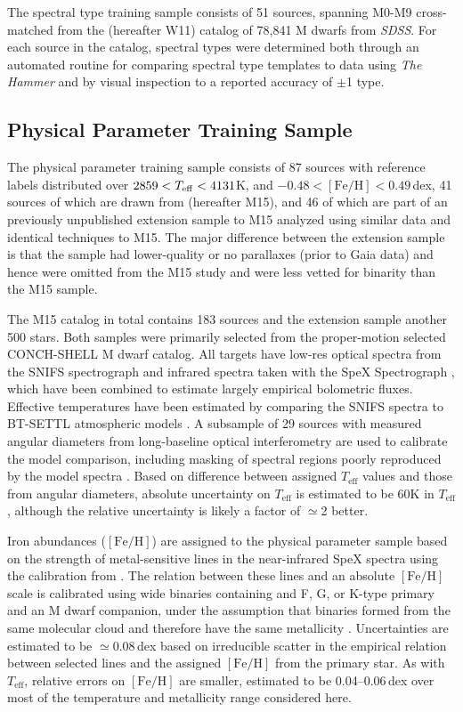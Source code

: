 \documentclass[twocolumn]{aastex62}
\newcommand{\sdss}{\textsl{SDSS}}
\newcommand{\teff}{T_{\mathrm{eff}}}
\newcommand{\feh}{[{\mathrm{Fe}/\mathrm{H}}]}
\begin{document}
The spectral type training sample consists of 51 sources, spanning M0-M9 cross-matched from the \citealt{West:2011} (hereafter W11) catalog of 78,841 M dwarfs from \sdss. For each source in the catalog, spectral types were determined both through an automated routine for comparing spectral type templates to data using \textsl{The Hammer} \citep{Covey:2007} and by visual inspection to a reported accuracy of $\pm$1 type.

\subsection{Physical Parameter Training Sample}

The physical parameter training sample consists of 87 sources with reference labels distributed over $2859 <T_{\rm eff} < 4131$K, and $-0.48 < \feh < 0.49$\,dex, 41 sources of which are drawn from \citealt{Mann:2015} (hereafter M15), and 46 of which are part of an previously unpublished extension sample to M15 analyzed using similar data and identical techniques to M15. The major difference between the extension sample is that the sample had lower-quality or no parallaxes (prior to Gaia data) and hence were omitted from the M15 study and were less vetted for binarity than the M15 sample.

The M15 catalog in total contains 183 sources and the extension sample another 500 stars. Both samples were primarily selected from the proper-motion selected CONCH-SHELL \citep{Gaidos:2013} M dwarf catalog. All targets have low-res optical spectra from the SNIFS spectrograph \citep{Lantz:2004} and infrared spectra taken with the SpeX Spectrograph \citep{Rayner:2003}, which have been combined to estimate largely empirical bolometric fluxes. Effective temperatures have been estimated by comparing the SNIFS spectra to BT-SETTL atmospheric models \citep{Allard:2011}. A subsample of 29 sources with measured angular diameters from long-baseline optical interferometry \citep{Boyajian:2012} are used to calibrate the model comparison, including masking of spectral regions poorly reproduced by the model spectra \citep{Mann:2013c}. Based on difference between assigned $\teff$ values and those from angular diameters, absolute uncertainty on $\teff$ is estimated to be 60K in $\teff$, although the relative uncertainty is likely a factor of $\simeq$2 better.

Iron abundances ($\feh$) are assigned to the physical parameter sample based on the strength of metal-sensitive lines in the near-infrared SpeX spectra \citep{RojasAyala:2010} using the calibration from \citet{Mann:2013a}. The relation between these lines and an absolute $\feh$ scale is calibrated using wide binaries containing and F, G, or K-type primary and an M dwarf companion, under the assumption that binaries formed from the same molecular cloud and therefore have the same metallicity \citep{Bonfils:2005}. Uncertainties are estimated to be $\simeq$0.08\,dex based on irreducible scatter in the empirical relation between selected lines and the assigned $\feh$ from the primary star. As with $\teff$, relative errors on $\feh$ are smaller, estimated to be 0.04--0.06\,dex over most of the temperature and metallicity range considered here.
\end{document}
